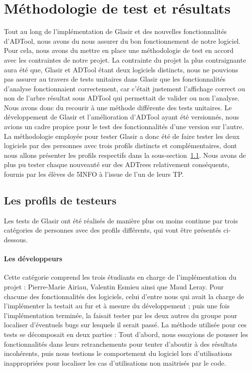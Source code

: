 \section{Méthodologie de test et résultats}
\label{sec:cr_tests}

Tout au long de l'implémentation de Glasir et des nouvelles fonctionnalités d'ADTool, nous avons du nous assurer du bon fonctionnement de notre logiciel. Pour cela, nous avons du mettre en place une méthodologie de test en accord avec les contraintes de notre projet. La contrainte du projet la plus contraignante aura été que, Glasir et ADTool étant deux logiciels distincts, nous ne pouvions pas assurer au travers de tests unitaires dans Glasir que les fonctionnalités d'analyse fonctionnaient correctement, car c'était justement l'affichage correct ou non de l'arbre résultat sous ADTool qui permettait de valider ou non l'analyse. Nous avons donc du recourir à une méthode différente des tests unitaires.
Le développement de Glasir et l'amélioration d'ADTool ayant été versionnés, nous avions un cadre propice pour le test des fonctionnalités d'une version sur l'autre. La méthodologie employée pour tester Glasir a donc été de faire tester les deux logiciels par des personnes avec trois profils distincts et complémentaires, dont nous allons présenter les profils respectifs dans la {\sc sous-section}~\ref{subsec:testeurs}. Nous avons de plus pu tester chaque nouveauté sur des ADTrees relativement conséquents, fournis par les élèves de 5INFO à l'issue de l'un de leurs TP.

\subsection{Les profils de testeurs}
\label{subsec:testeurs}

Les tests de Glasir ont été réalisés de manière plus ou moins continue par trois catégories de personnes avec des profils différents, qui vont être présentés ci-dessous.

\paragraph{Les développeurs} Cette catégorie comprend les trois étudiants en charge de l'implémentation du projet : Pierre-Marie {\sc Airiau}, Valentin {\sc Esmieu} ainsi que Maud {\sc Leray}. Pour chacune des fonctionnalités des logiciels, celui d'entre nous qui avait la charge de l'implémenter la testait au fur et à mesure du développement ; puis une fois l'implémentation terminée, la faisait tester par les deux autres du groupe pour localiser d'éventuels bugs sur lesquels il serait passé. La méthode utilisée pour ces tests se décomposait en deux parties : Tout d'abord, nous essayions de pousser les fonctionnalités dans leurs retranchements pour tenter d'aboutir à des résultats incohérents, puis nous testions le comportement du logiciel lors d'utilisations inappropriées pour localiser les cas d'utilisations non maitrisés par le code.

